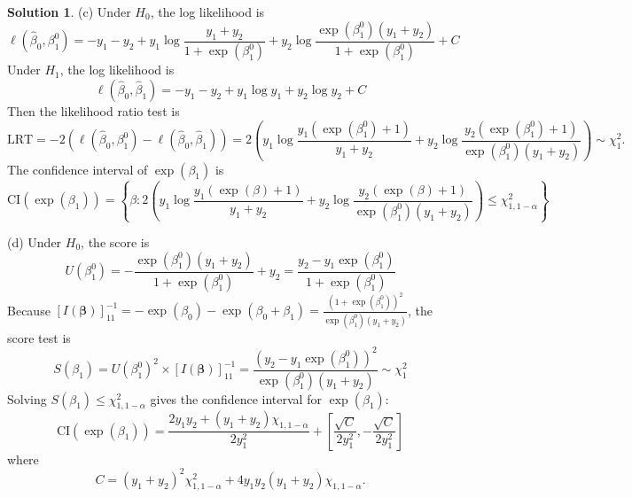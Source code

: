 \documentclass[11pt,letterpaper,english,oneside]{article} %
\theoremstyle{definition} %
\newtheorem{solution}{Solution}
\newenvironment{sol}{\begin{solution}\hspace{0pt}}{\end{solution}}
\begin{document}
\begin{sol}
(c) Under $H_0$, the log likelihood is
\begin{equation}
	\ell(\hat{\beta}_0,\beta_1^0)=-y_1-y_2+y_1\log\frac{y_1+y_2}{1+\exp(\beta_1^0)}+y_2\log\frac{\exp(\beta_1^0)(y_1+y_2)}{1+\exp(\beta_1^0)}+C
\end{equation}
Under $H_1$, the log likelihood is 
\begin{equation}
	\ell(\hat{\beta}_0,\hat{\beta}_1)=-y_1-y_2+y_1\log y_1+y_2\log y_2+C
\end{equation}
Then the likelihood ratio test is
\begin{equation}
	\text{LRT}=-2(	\ell(\hat{\beta}_0,\beta_1^0)-\ell(\hat{\beta}_0,\hat{\beta}_1))=2\left(y_1\log\frac{y_1(\exp(\beta_1^0)+1)}{y_1+y_2}+y_2\log\frac{y_2(\exp(\beta_1^0)+1)}{\exp(\beta_1^0)(y_1+y_2)}\right)\sim\chi^2_1.
\end{equation}
The confidence interval  of  $\exp(\beta_1)$ is 
\begin{equation}
	\text{CI}(\exp(\beta_1))=\left\{\beta:2\left(y_1\log\frac{y_1(\exp(\beta)+1)}{y_1+y_2}+y_2\log\frac{y_2(\exp(\beta)+1)}{\exp(\beta_1^0)(y_1+y_2)}\right)\leq\chi^2_{1,1-\alpha}\right\}
\end{equation}

(d) Under $H_0$, the score is 
\begin{equation}
	U(\beta_1^0)=-\frac{\exp(\beta_1^0)(y_1+y_2)}{1+\exp(\beta_1^0)}+y_2=\frac{y_2-y_1\exp(\beta_1^0)}{1+\exp(\beta_1^0)}
\end{equation}
Because $\left[I(\bm{\beta})\right]^{-1}_{11}=-\exp(\beta_0)-\exp(\beta_0+\beta_1)=\frac{(1+\exp(\beta_1^0))^2}{\exp(\beta_1^0)(y_1+y_2)}$, the score test is
\begin{equation}
	S(\beta_1) =U(\beta_1^0)^2\times\left[I(\bm{\beta})\right]^{-1}_{11}= \frac{\left(y_2-y_1\exp(\beta_1^0)\right)^2}{\exp(\beta_1^0)(y_1+y_2)}\sim\chi^2_1
\end{equation}
Solving $S(\beta_1)\leq \chi^2_{1,1-\alpha}$ gives the confidence interval for $\exp(\beta_1)$:
\begin{equation}
	\text{CI}(\exp(\beta_1))=\frac{2y_1y_2+(y_1+y_2)\chi_{1,1-\alpha}}{2y_1^2}+\left[\frac{\sqrt{C}}{2y_1^2},-\frac{\sqrt{C}}{2y_1^2}\right]
\end{equation}
where
\begin{equation}
	C=(y_1+y_2)^2\chi_{1,1-\alpha}^2+4y_1y_2(y_1+y_2)\chi_{1,1-\alpha}.
\end{equation}
\end{sol}
\end{document}
